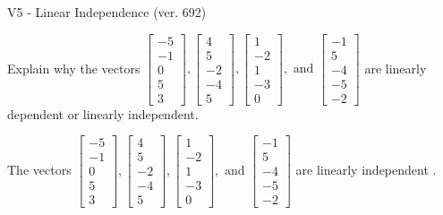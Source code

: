 \begin{exercise}
  \begin{exerciseTitle}V5 - Linear Independence (ver. 692)\end{exerciseTitle}
  \begin{exerciseStatement}
    Explain why the vectors \(\left[\begin{array}{r}
-5 \\
-1 \\
0 \\
5 \\
3
\end{array}\right] , \left[\begin{array}{r}
4 \\
5 \\
-2 \\
-4 \\
5
\end{array}\right] , \left[\begin{array}{r}
1 \\
-2 \\
1 \\
-3 \\
0
\end{array}\right] , \text{ and } \left[\begin{array}{r}
-1 \\
5 \\
-4 \\
-5 \\
-2
\end{array}\right]\) are linearly dependent or linearly independent.	


  \end{exerciseStatement}
  \begin{exerciseAnswer}
   The vectors \(\left[\begin{array}{r}
-5 \\
-1 \\
0 \\
5 \\
3
\end{array}\right] , \left[\begin{array}{r}
4 \\
5 \\
-2 \\
-4 \\
5
\end{array}\right] , \left[\begin{array}{r}
1 \\
-2 \\
1 \\
-3 \\
0
\end{array}\right] , \text{ and } \left[\begin{array}{r}
-1 \\
5 \\
-4 \\
-5 \\
-2
\end{array}\right]\) are 
  	 linearly independent  .
  


  \end{exerciseAnswer}
\end{exercise}